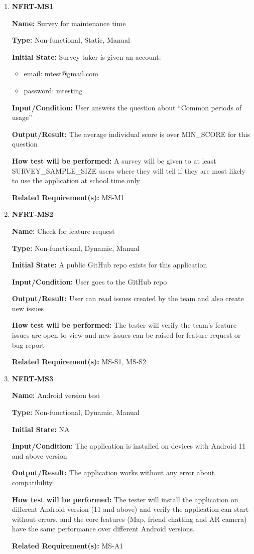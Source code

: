 \documentclass[12pt, titlepage]{article}
\begin{document}
\begin{enumerate}
\item{\textbf{NFRT-MS1}}

\textbf{Name:} Survey for maintenance time

\textbf{Type:} Non-functional, Static, Manual

\textbf{Initial State:} Survey taker is given an account:
\begin{itemize}
\item email: mtest@gmail.com
\item password: mtesting
\end{itemize}

\textbf{Input/Condition:} User answers the question about ``Common periods of usage''

\textbf{Output/Result:} The average individual score is over MIN\_SCORE for this question

\textbf{How test will be performed:} A survey will be given to at least SURVEY\_SAMPLE\_SIZE users where they will tell if they are most likely to use the application at school time only

\textbf{Related Requirement(s):} MS-M1

\item{\textbf{NFRT-MS2}}

\textbf{Name:} Check for feature request

\textbf{Type:} Non-functional, Dynamic, Manual
					
\textbf{Initial State:} A public GitHub repo exists for this application

\textbf{Input/Condition:} User goes to the GitHub repo

\textbf{Output/Result:} User can read issues created by the team and also create new issues

\textbf{How test will be performed:} The tester will verify the team's feature issues are open to view and new issues can be raised for feature request or bug report

\textbf{Related Requirement(s):} MS-S1, MS-S2

\item{\textbf{NFRT-MS3}}

\textbf{Name:} Android version test

\textbf{Type:} Non-functional, Dynamic, Manual
					
\textbf{Initial State:} NA

\textbf{Input/Condition:} The application is installed on devices with Android 11 and above version

\textbf{Output/Result:} The application works without any error about compatibility

\textbf{How test will be performed:} The tester will install the application on different Android version (11 and above) and verify the application can start without errors, and the core features (Map, friend chatting and AR camera) have the same performance over different Android versions.

\textbf{Related Requirement(s):} MS-A1
\end{enumerate}
\end{document}
